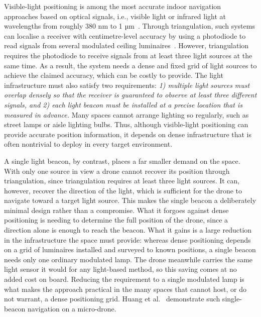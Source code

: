 Visible-light positioning is among the most accurate indoor navigation approaches based on optical signals, i.e., visible light or infrared light at wavelengths from roughly 380 nm to 1 µm~\cite{hecht2017optics}. Through triangulation, such systems can localise a receiver with centimetre-level accuracy by using a photodiode to read signals from several modulated ceiling luminaires~\cite{kuo2014luxapose, zhuang2018vlp}. However, triangulation requires the photodiode to receive signals from at least three light sources at the same time. As a result, the system needs a dense and fixed grid of light sources to achieve the claimed accuracy, which can be costly to provide. The light infrastructure must also satisfy two requirements: \textit{1) multiple light sources must overlap densely so that the receiver is guaranteed to observe at least three different signals, and 2) each light beacon must be installed at a precise location that is measured in advance.} Many spaces cannot arrange lighting so regularly, such as street lamps or aisle lighting bulbs. Thus, although visible-light positioning can provide accurate position information, it depends on dense infrastructure that is often nontrivial to deploy in every target environment.


A single light beacon, by contrast, places a far smaller demand on the space. With only one source in view a drone cannot recover its position through triangulation, since triangulation requires at least three light sources. It can, however, recover the direction of the light, which is sufficient for the drone to navigate toward a target light source. This makes the single beacon a deliberately minimal design rather than a compromise. What it forgoes against dense positioning is needing to determine the full position of the drone, since a direction alone is enough to reach the beacon. What it gains is a large reduction in the infrastructure the space must provide: whereas dense positioning depends on a grid of luminaires installed and surveyed to known positions, a single beacon needs only one ordinary modulated lamp. The drone meanwhile carries the same light sensor it would for any light-based method, so this saving comes at no added cost on board. Reducing the requirement to a single modulated lamp is what makes the approach practical in the many spaces that cannot host, or do not warrant, a dense positioning grid. Huang et al.~\cite{huang2026lta} demonstrate such single-beacon navigation on a micro-drone.

